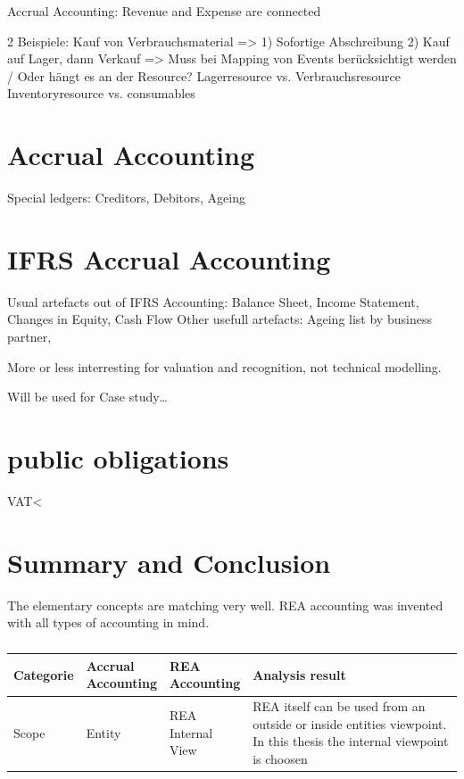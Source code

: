 Accrual Accounting: Revenue and Expense are connected

2 Beispiele: Kauf von Verbrauchsmaterial => 1) Sofortige Abschreibung 2) Kauf auf Lager, dann Verkauf => Muss bei Mapping von Events berücksichtigt werden / Oder hängt es an der Resource? Lagerresource vs. Verbrauchsresource Inventoryresource vs. consumables

\section{Accrual Accounting}
Special ledgers: Creditors, Debitors, Ageing




\section{IFRS Accrual Accounting}
Usual artefacts out of IFRS Accounting: Balance Sheet, Income Statement, Changes in Equity, Cash Flow
Other usefull artefacts: Ageing list by business partner,


More or less interresting for valuation and recognition, not technical
modelling.

Will be used for Case study\ldots

\section{public obligations}
VAT<
\section{Summary and Conclusion}

The elementary concepts are matching very well.
REA accounting was invented with all types of accounting in mind.

\begin{table}
	\caption{}\label{tab:Elementary concepts}\caption*{}
	\begin{tabular}{|p{0.15\linewidth}|p{0.15\linewidth}|p{0.15\linewidth}|p{0.55\linewidth}|}
		\hline
		Categorie & Accrual Accounting & REA\textcopyright{} Accounting & Analysis result
		\\
		\hline
		Scope     & Entity             & REA Internal View              & REA itself can be used from an outside or
		inside entities viewpoint. In this thesis the internal viewpoint is
		choosen
		\\
	\end{tabular}
\end{table}